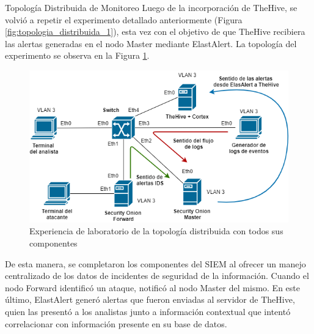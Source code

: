 \begin{subsection}{Topología Distribuida de Monitoreo}
    Luego de la incorporación de TheHive, se volvió a repetir el experimento detallado anteriormente (Figura \ref{fig:topologia_distribuida_1}), esta vez con el objetivo de que TheHive recibiera las alertas generadas en el nodo Master mediante ElastAlert. La topología del experimento se observa en la Figura \ref{fig:topologia_distribuida_2}.\par
    \begin{figure}[H]
    \centering         \includegraphics[width=1\textwidth]{./iteracion_1_imagenes/figura_33_e_topologia_de_prueba_3.png}
    \caption{Experiencia de laboratorio de la topología distribuida con todos sus componentes}
    \label{fig:topologia_distribuida_2}
    \end{figure}
    \FloatBarrier
    De esta manera, se completaron los componentes del SIEM al ofrecer un manejo centralizado de los datos de incidentes de seguridad de la información. Cuando el nodo Forward identificó un  ataque, notificó al nodo Master del mismo. En este último, ElastAlert generó alertas que fueron enviadas al servidor de TheHive, quien las presentó a los analistas junto a información contextual que intentó correlacionar con información presente en su base de datos.\par
    

\end{subsection}
